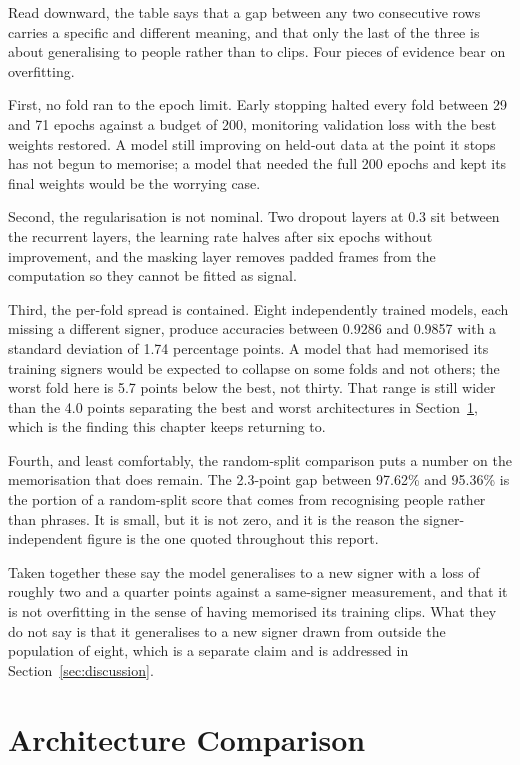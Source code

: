 \noindent Read downward, the table says that a gap between any two consecutive rows carries a specific and different meaning, and that only the last of the three is about generalising to people rather than to clips. Four pieces of evidence bear on overfitting.

First, no fold ran to the epoch limit. Early stopping halted every fold between 29 and 71
epochs against a budget of 200, monitoring validation loss with the best weights restored.
A model still improving on held-out data at the point it stops has not begun to memorise;
a model that needed the full 200 epochs and kept its final weights would be the worrying
case.

Second, the regularisation is not nominal. Two dropout layers at 0.3 sit between the
recurrent layers, the learning rate halves after six epochs without improvement, and the
masking layer removes padded frames from the computation so they cannot be fitted as
signal.

Third, the per-fold spread is contained. Eight independently trained models, each missing a
different signer, produce accuracies between 0.9286 and 0.9857 with a standard deviation
of 1.74 percentage points. A model that had memorised its training signers would be
expected to collapse on some folds and not others; the worst fold here is 5.7 points below
the best, not thirty. That range is still wider than the 4.0 points separating the best and
worst architectures in Section~\ref{sec:ablation}, which is the finding this chapter keeps
returning to.

Fourth, and least comfortably, the random-split comparison puts a number on the
memorisation that does remain. The 2.3-point gap between 97.62\% and 95.36\% is the
portion of a random-split score that comes from recognising people rather than phrases. It
is small, but it is not zero, and it is the reason the signer-independent figure is the one
quoted throughout this report.

Taken together these say the model generalises to a new signer with a loss of roughly two
and a quarter points against a same-signer measurement, and that it is not overfitting in the
sense of having memorised its training clips. What they do not say is that it generalises
to a new signer drawn from outside the population of eight, which is a separate claim and
is addressed in Section~\ref{sec:discussion}.

\section{Architecture Comparison}
\label{sec:ablation}

